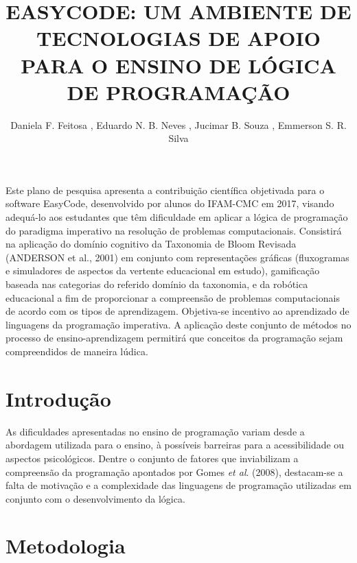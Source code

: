 \documentclass[12pt]{article}
\title{EASYCODE: UM AMBIENTE DE TECNOLOGIAS DE APOIO PARA O ENSINO DE LÓGICA DE PROGRAMAÇÃO}
\author{Daniela F. Feitosa \inst{1}, Eduardo N. B. Neves \inst{2}, Jucimar B. Souza \inst{1}, Emmerson S. R. Silva \inst{3} }
\begin{document}
 

\maketitle

\begin{abstract}
\end{abstract}
     
\begin{resumo}
Este plano de pesquisa apresenta a contribuição científica objetivada para o software EasyCode, desenvolvido por alunos do IFAM-CMC em 2017, visando adequá-lo aos estudantes que têm dificuldade em aplicar a lógica de programação do paradigma imperativo na resolução de problemas computacionais. Consistirá na aplicação do domínio cognitivo da Taxonomia de Bloom Revisada (ANDERSON et al., 2001) em conjunto com representações gráficas (fluxogramas e simuladores de aspectos da vertente educacional em estudo), gamificação baseada nas categorias do referido domínio da taxonomia, e da robótica educacional a fim de proporcionar a compreensão de problemas computacionais de acordo com os tipos de aprendizagem. Objetiva-se incentivo ao aprendizado de linguagens da programação imperativa. A aplicação deste conjunto de métodos no processo de ensino-aprendizagem permitirá que conceitos da programação sejam compreendidos de maneira lúdica.
\end{resumo}

\section{Introdução}
As dificuldades apresentadas no ensino de programação variam desde a abordagem utilizada para o ensino, à possíveis barreiras para a acessibilidade ou aspectos psicológicos. Dentre o conjunto de fatores que inviabilizam a compreensão da programação apontados por Gomes \textit{et al}. (2008), destacam-se a falta de motivação e a complexidade das linguagens de programação utilizadas em conjunto com o 	desenvolvimento da lógica.

\section{Metodologia}
\end{document}
